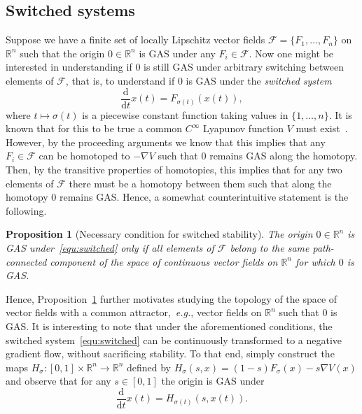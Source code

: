 \documentclass[letterpaper, 10 pt, conference]{ieeeconf}  %
\theoremstyle{mystyle}
\newtheorem{proposition}[theorem]{Proposition}
\begin{document}
{
\subsection{Switched systems}
Suppose we have a finite set of locally Lipschitz vector fields $\mathcal{F}=\{F_1,\dots,F_n\}$ on $\mathbb{R}^n$ such that the origin $0\in \mathbb{R}^n$ is GAS under any $F_i\in \mathcal{F}$. Now one might be interested in understanding if $0$ is still GAS under arbitrary switching between elements of $\mathcal{F}$, that is, to understand if $0$ is GAS under the \textit{switched system}
\begin{equation}
\label{equ:switched}
    \frac{\mathrm{d}}{\mathrm{d}t}x(t) = F_{\sigma(t)}(x(t)),
\end{equation}
where $t\mapsto \sigma(t)$ is a piecewise constant function taking values in $\{1,\dots,n\}$. It is known that for this to be true a common $C^{\infty}$ Lyapunov function $V$ must exist~\cite{ref:mancilla2000converse}. However, by the proceeding arguments we know that this implies that any $F_i\in \mathcal{F}$ can be homotoped to $-\nabla V$ such that $0$ remains GAS along the homotopy. Then, by the transitive properties of homotopies, this implies that for any two elements of $\mathcal{F}$ there must be a homotopy between them such that along the homotopy $0$ remains GAS. Hence, a somewhat counterintuitive statement is the following.

\begin{proposition}[Necessary condition for switched stability]
\label{prop:nec:switched}
    The origin $0\in \mathbb{R}^n$ is GAS under~\eqref{equ:switched} only if all elements of $\mathcal{F}$ belong to the same path-connected component of the space of continuous vector fields on $\mathbb{R}^n$ for which $0$ is GAS. 
\end{proposition}

Hence, Proposition~\ref{prop:nec:switched} further motivates studying the topology of the space of vector fields with a common attractor,~\textit{e.g.}, vector fields on $\mathbb{R}^n$ such that $0$ is GAS. {It is interesting to note that under the aforementioned conditions, the switched system~\eqref{equ:switched} can be continuously transformed to a negative gradient flow, without sacrificing stability. To that end, simply construct the maps $H_{\sigma}:[0,1]\times \mathbb{R}^n\to \mathbb{R}^n$ defined by $H_{\sigma}(s,x)=(1-s)F_{\sigma}(x)-s\nabla V(x)$ and observe that for any $s\in [0,1]$ the origin is GAS under
\begin{equation*}
    \frac{\mathrm{d}}{\mathrm{d}t}x(t) = H_{\sigma(t)}(s,x(t)). 
\end{equation*}
}



}
\end{document}
